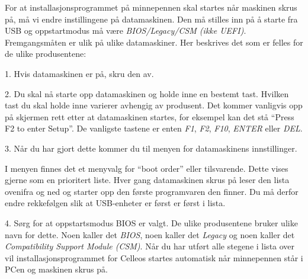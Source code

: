 For at installasjonsprogrammet p\aa{} minnepennen skal startes n\aa r maskinen skrus p\aa , m\aa{} vi endre instillingene p\aa{} datamaskinen. Den m\aa{} stilles inn p\aa{} \aa{} starte fra USB og oppstartmodus m\aa{} v\ae re {\it BIOS/Legacy/CSM (ikke UEFI)}. Fremgangsm\aa ten er ulik p\aa{} ulike datamaskiner. Her beskrives det som er felles for de ulike produsentene: 
\item{1.} Hvis datamaskinen er p\aa, skru den av.
\item{2.} Du skal n\aa{} starte opp datamaskinen og holde inne en bestemt tast. Hvilken tast du skal holde inne varierer avhengig av produsent. Det kommer vanligvis opp p\aa{} skjermen rett etter at datamaskinen startes, for eksempel kan det st\aa{} ``Press F2 to enter Setup''. De vanligste tastene er enten {\it F1}, {\it F2}, {\it F10}, {\it ENTER} eller {\it DEL}.
\item{3.} N\aa r du har gjort dette kommer du til menyen for datamaskinens innstillinger. 
\medskip
{}
\item{} I menyen finnes det et menyvalg for ``boot order'' eller tilsvarende. Dette vises gjerne som en prioritert liste. Hver gang datamaskinen skrus p\aa{} leser den lista ovenifra og ned og starter opp den f\o rste programvaren den finner. Du m\aa{} derfor endre rekkef\o lgen slik at USB-enheter er f\o rst er f\o rst i lista.
\item{4.} S\o rg for at oppstartsmodus BIOS er valgt. De ulike produsentene bruker ulike navn for dette. Noen kaller det {\it BIOS}, noen kaller det {\it Legacy} og noen kaller det {\it Compatibility Support Module (CSM)}.
\smallskip
\noindent N\aa r du har utf\o rt alle stegene i lista over vil installasjonsprogrammet for Celleos startes automatisk n\aa r minnepennen st\aa r i PCen og maskinen skrus p\aa.



